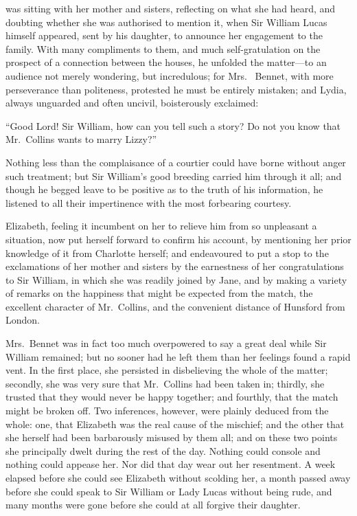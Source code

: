  was sitting with her mother and sisters, reflecting on
what she had heard, and doubting whether she was authorised to
mention it, when Sir William Lucas himself appeared, sent by his
daughter, to announce her engagement to the family.  With many
compliments to them, and much self-gratulation on the prospect
of a connection between the houses, he unfolded the matter---to
an audience not merely wondering, but incredulous; for Mrs.\ %
Bennet, with more perseverance than politeness, protested he
must be entirely mistaken; and Lydia, always unguarded and
often uncivil, boisterously exclaimed:

``Good Lord! Sir William, how can you tell such a story?  Do not
you know that Mr.\ Collins wants to marry Lizzy?''

Nothing less than the complaisance of a courtier could have
borne without anger such treatment; but Sir William's good
breeding carried him through it all; and though he begged leave
to be positive as to the truth of his information, he listened
to all their impertinence with the most forbearing courtesy.

Elizabeth, feeling it incumbent on her to relieve him from so
unpleasant a situation, now put herself forward to confirm his
account, by mentioning her prior knowledge of it from Charlotte
herself; and endeavoured to put a stop to the exclamations of her
mother and sisters by the earnestness of her congratulations to
Sir William, in which she was readily joined by Jane, and by
making a variety of remarks on the happiness that might be
expected from the match, the excellent character of Mr.\ Collins,
and the convenient distance of Hunsford from London.

Mrs.\ Bennet was in fact too much overpowered to say a great
deal while Sir William remained; but no sooner had he left them
than her feelings found a rapid vent.  In the first place, she
persisted in disbelieving the whole of the matter; secondly, she
was very sure that Mr.\ Collins had been taken in; thirdly, she
trusted that they would never be happy together; and fourthly,
that the match might be broken off.  Two inferences, however,
were plainly deduced from the whole: one, that Elizabeth was
the real cause of the mischief; and the other that she herself had
been barbarously misused by them all; and on these two points
she principally dwelt during the rest of the day.  Nothing could
console and nothing could appease her.  Nor did that day wear
out her resentment.  A week elapsed before she could see
Elizabeth without scolding her, a month passed away before she
could speak to Sir William or Lady Lucas without being rude,
and many months were gone before she could at all forgive their
daughter.

